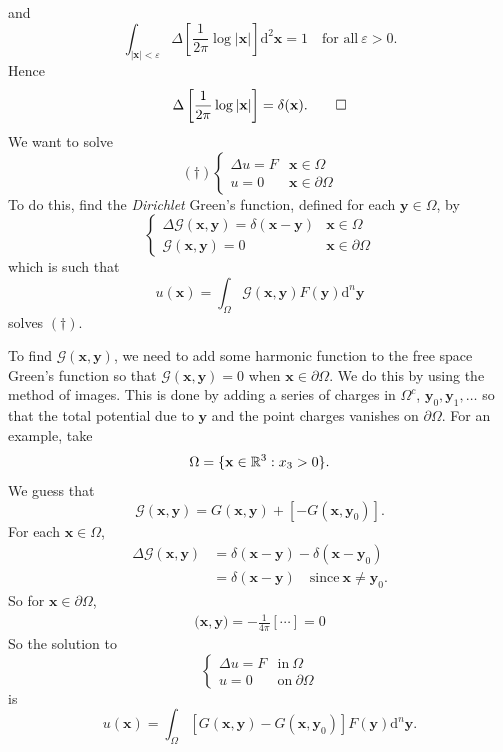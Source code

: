 \documentclass{article}
\begin{document}
and 
\[
	\int_{|\mathbf x|<\varepsilon}\Delta\left[\frac1{2\pi}\log|\mathbf x|\right]\mathrm d^2\mathbf x=1\quad \text{for all}\ \varepsilon>0.
\]
Hence
\[
	\Delta\left[\frac 1{2\pi}\log|\mathbf x|\right]=\delta(\mathbf x).\qed
\]
We want to solve
\[
	(\dagger)\begin{cases}
		\Delta u=F & \mathbf x\in \Omega\\
		u=0 & \mathbf x\in\partial\Omega
	\end{cases}
\]
To do this, find the \textit{Dirichlet} Green's function, defined for each $ \mathbf y\in \Omega $, by
\[
  \begin{cases}
	  \Delta\mathcal G(\mathbf x,\mathbf y)=\delta(\mathbf x-\mathbf y) & \mathbf x\in \Omega \\
	 \mathcal G(\mathbf x,\mathbf y)=0 & \mathbf x\in \partial\Omega
  \end{cases}
\]
which is such that
\[
  u(\mathbf x)=\int_\Omega \mathcal G(\mathbf x,\mathbf y )F(\mathbf y)\mathrm d^n\mathbf y 
\]
solves $ (\dagger) $.\par
To find $ \mathcal G(\mathbf x,\mathbf y) $, we need to add some harmonic function to the free space Green's function so that $ \mathcal G(\mathbf x,\mathbf y)=0 $ when $ \mathbf x\in \partial\Omega $. We do this by using the method of images. This is done by adding a series of charges in $ \Omega^c $, $ \mathbf y_0,\mathbf y_1,\dots $ so that the total potential due to $ \mathbf y $ and the point charges vanishes on $ \partial\Omega $. For an example, take
\[
	\Omega=\{\mathbf x\in \mathbb{R}^3:x_3>0\}.
\]
We guess that
\[
	\mathcal G(\mathbf x,\mathbf y)=G(\mathbf x,\mathbf y)+[-G(\mathbf x,\mathbf y_0)].
\]
For each $ \mathbf x\in \Omega $,
\begin{align*}
	\Delta\mathcal G(\mathbf x,\mathbf y)&=\delta(\mathbf x-\mathbf y)-\delta(\mathbf x-\mathbf y_0)\\
					     &=\delta(\mathbf x-\mathbf y)\quad\text{since}\ \mathbf x\ne \mathbf y_0.
\end{align*}
So for $ \mathbf x\in \partial\Omega $,
\begin{align*}
	\mathcal(\mathbf x,\mathbf y)=-\frac1{4\pi}\left[\cdots\right]=0
\end{align*}
So the solution to
\[
  \begin{cases}
\Delta u=F & \text{in}\ \Omega\\
u=0 & \text{on}\ \partial\Omega
  \end{cases}
\]
is
\[
	u(\mathbf x)=\int_\Omega[G(\mathbf x,\mathbf y)-G(\mathbf x,\mathbf y_0)]F(\mathbf y)\mathrm d^n\mathbf y.
\]
\end{document}
